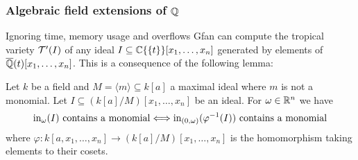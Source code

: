 \subsubsection{Algebraic field extensions of $\mathbb{Q}$}
Ignoring time, memory usage and overflows Gfan can compute the tropical variety $ \mathcal{T} '(I)$ of any ideal $I\subseteq {\ensuremath{\mathbb{C}\{\{t\}\}} }[x_1,\dots,x_n]$ generated by elements of $\overline{\mathbb{Q}}(t)[x_1,\dots,x_n]$. This is a consequence of the following lemma:
\begin{lemma}\cite[Lemma~3.12]{lifting}
\label{lem:fieldextension}
Let $k$ be a field and $M=\langle m\rangle\subseteq k[a]$ a maximal ideal where $m$ is not a monomial. Let 
$I\subseteq (k[a]/M)[x_1,\dots,x_n]$ be an ideal. For $\omega\in\mathbb{R}^n$ we
have
$$\textup{in}_\omega(I) \textup{ contains a monomial} \Longleftrightarrow \textup{in}_{(0,\omega)}(\varphi^{-1}(I)) \textup{ contains a monomial}$$ 
where $\varphi:k[a,x_1,\dots,x_n]\rightarrow (k[a]/M)[x_1,\dots,x_n]$ is the homomorphism taking elements to their cosets.
\end{lemma}
